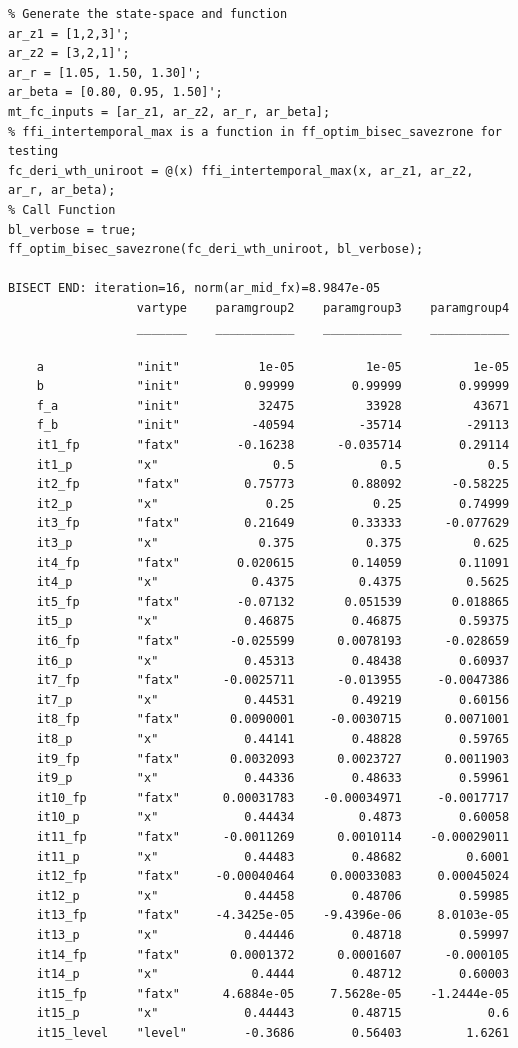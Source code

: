 \documentclass[
]{book}
\begin{document}
\begin{verbatim}
% Generate the state-space and function
ar_z1 = [1,2,3]';
ar_z2 = [3,2,1]';
ar_r = [1.05, 1.50, 1.30]';
ar_beta = [0.80, 0.95, 1.50]';
mt_fc_inputs = [ar_z1, ar_z2, ar_r, ar_beta];
% ffi_intertemporal_max is a function in ff_optim_bisec_savezrone for testing
fc_deri_wth_uniroot = @(x) ffi_intertemporal_max(x, ar_z1, ar_z2, ar_r, ar_beta);
% Call Function
bl_verbose = true;
ff_optim_bisec_savezrone(fc_deri_wth_uniroot, bl_verbose);

BISECT END: iteration=16, norm(ar_mid_fx)=8.9847e-05
                  vartype    paramgroup2    paramgroup3    paramgroup4
                  _______    ___________    ___________    ___________

    a             "init"           1e-05          1e-05          1e-05
    b             "init"         0.99999        0.99999        0.99999
    f_a           "init"           32475          33928          43671
    f_b           "init"          -40594         -35714         -29113
    it1_fp        "fatx"        -0.16238      -0.035714        0.29114
    it1_p         "x"                0.5            0.5            0.5
    it2_fp        "fatx"         0.75773        0.88092       -0.58225
    it2_p         "x"               0.25           0.25        0.74999
    it3_fp        "fatx"         0.21649        0.33333      -0.077629
    it3_p         "x"              0.375          0.375          0.625
    it4_fp        "fatx"        0.020615        0.14059        0.11091
    it4_p         "x"             0.4375         0.4375         0.5625
    it5_fp        "fatx"        -0.07132       0.051539       0.018865
    it5_p         "x"            0.46875        0.46875        0.59375
    it6_fp        "fatx"       -0.025599      0.0078193      -0.028659
    it6_p         "x"            0.45313        0.48438        0.60937
    it7_fp        "fatx"      -0.0025711      -0.013955     -0.0047386
    it7_p         "x"            0.44531        0.49219        0.60156
    it8_fp        "fatx"       0.0090001     -0.0030715      0.0071001
    it8_p         "x"            0.44141        0.48828        0.59765
    it9_fp        "fatx"       0.0032093      0.0023727      0.0011903
    it9_p         "x"            0.44336        0.48633        0.59961
    it10_fp       "fatx"      0.00031783    -0.00034971     -0.0017717
    it10_p        "x"            0.44434         0.4873        0.60058
    it11_fp       "fatx"      -0.0011269      0.0010114    -0.00029011
    it11_p        "x"            0.44483        0.48682         0.6001
    it12_fp       "fatx"     -0.00040464     0.00033083     0.00045024
    it12_p        "x"            0.44458        0.48706        0.59985
    it13_fp       "fatx"     -4.3425e-05    -9.4396e-06     8.0103e-05
    it13_p        "x"            0.44446        0.48718        0.59997
    it14_fp       "fatx"       0.0001372      0.0001607      -0.000105
    it14_p        "x"             0.4444        0.48712        0.60003
    it15_fp       "fatx"      4.6884e-05     7.5628e-05    -1.2444e-05
    it15_p        "x"            0.44443        0.48715            0.6
    it15_level    "level"        -0.3686        0.56403         1.6261
\end{verbatim}
\end{document}
